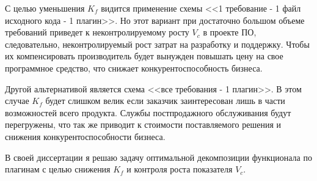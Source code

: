 С целью уменьшения $K_{f}$ видится применение схемы <<1 требование - 1 файл исходного кода - 1 плагин>>. Но этот вариант при достаточно большом объеме требований приведет к неконтролируемому росту $V_{c}$ в проекте ПО, следовательно, неконтролируемый рост затрат на разработку и поддержку. Чтобы их компенсировать производитель будет вынужден повышать цену на свое программное средство, что снижает конкурентоспособность бизнеса.

Другой альтернативой является схема <<все требования - 1 плагин>>. В этом случае $K_{f}$ будет слишком велик если заказчик заинтересован лишь в части возможностей всего продукта. Службы постпродажного обслуживания будут перегружены, что так же приводит к стоимости поставляемого решения и снижения конкурентоспособности бизнеса.

В своей диссертации я решаю задачу оптимальной декомпозиции функционала по плагинам с целью снижения $K_{f}$ и контроля роста показателя $V_{c}$.